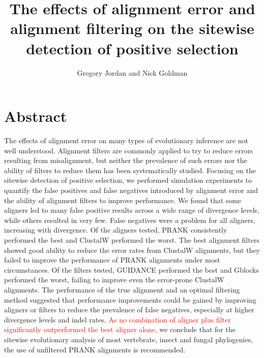 \documentclass{article}
\begin{document}
\newcommand{\mtwo}{PAML M2a\xspace}
\newcommand{\meight}{PAML M8\xspace}
\newcommand{\pranka}{PRANK$_{\textrm{AA}}$\xspace}
\newcommand{\prankc}{PRANK$_{\textrm{C}}$\xspace}
\newcommand{\omg}{\bm{\omega}\xspace}
\newcommand{\tpr}{TPR$_{1\%}$\xspace}
\newcommand{\sw}{sitewise\xspace}
\newcommand{\Sw}{Sitewise\xspace}
\newcommand{\Dr}{{\em Drosophila}\xspace}

\title{The effects of alignment error and alignment filtering on the \sw detection of positive selection}

\author{{Gregory Jordan and Nick Goldman}\\
}

\section*{Abstract}

The effects of alignment error on many types of evolutionary inference
are not well understood. Alignment filters are commonly applied to try
to reduce errors resulting from misalignment, but neither the
prevalence of such errors nor the ability of filters to reduce them
has been systematically studied. Focusing on the sitewise detection of
positive selection, we performed simulation experiments to quantify
the false positives and false negatives introduced by alignment error
and the ability of alignment filters to improve performance. We found
that some aligners led to many false positive results across a wide
range of divergence levels, while others resulted in very few. False
negatives were a problem for all aligners, increasing with
divergence. Of the aligners tested, PRANK consistently performed the
best and ClustalW performed the worst. The best alignment filters
showed good ability to reduce the error rates from ClustalW
alignments, but they failed to improve the performance of PRANK
alignments under most circumstances. Of the filters tested, GUIDANCE
performed the best and Gblocks performed the worst, failing to improve
even the error-prone ClustalW alignments. The performance of the true
alignment and an optimal filtering method suggested that performance
improvements could be gained by improving aligners or filters to
reduce the prevalence of false negatives, especially at higher
divergence levels and indel rates. \textcolor{red}{As no combination
  of aligner plus filter significantly outperformed the best aligner
  alone,} we conclude that for the sitewise evolutionary analysis of
most vertebrate, insect and fungal phylogenies, the use of unfiltered
PRANK alignments is recommended.
\end{document}

